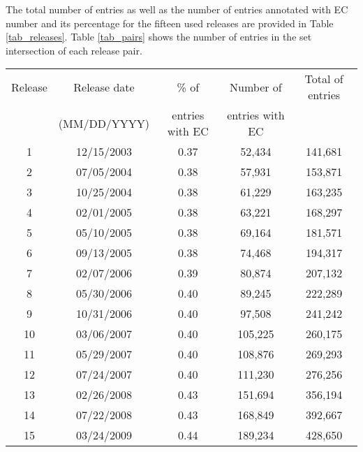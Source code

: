 The total number of entries as well as the number of entries annotated with EC number and its percentage for the fifteen used releases are provided in Table \ref{tab_releases}. Table \ref{tab_pairs} shows the number of entries in the set intersection of each release pair. 


\begin{table*}[!h]
  \caption{Releases 1 to 15 of UniProt/SwissProt.}
  \label{tab_releases}
  \scriptsize
  \begin{center}
    \begin{tabular}{ccccc}
      Release & Release date & \% of & Number of & Total of entries\\
& (MM/DD/YYYY) & entries with EC & entries with EC & \\
    \hline
	1 & 12/15/2003 & 0.37 & 52,434 & 141,681 \\
	2 & 07/05/2004 & 0.38 & 57,931 & 153,871 \\ 
	3 & 10/25/2004 & 0.38 & 61,229 & 163,235 \\ 
	4 & 02/01/2005 & 0.38 & 63,221 & 168,297 \\ 
	5 & 05/10/2005 & 0.38 & 69,164 & 181,571 \\ 
	6 & 09/13/2005 & 0.38 & 74,468 & 194,317 \\ 
	7 & 02/07/2006 & 0.39 & 80,874 & 207,132 \\ 
	8 & 05/30/2006 & 0.40 & 89,245 & 222,289 \\ 
	9 & 10/31/2006 & 0.40 & 97,508 & 241,242 \\ 
	10 & 03/06/2007 & 0.40 & 105,225 & 260,175 \\ 
	11 & 05/29/2007 & 0.40 & 108,876 & 269,293 \\ 
	12 & 07/24/2007 & 0.40 & 111,230 & 276,256 \\ 
	13 & 02/26/2008 & 0.43 & 151,694 & 356,194 \\ 
	14 & 07/22/2008 & 0.43 & 168,849 & 392,667 \\ 
	15 & 03/24/2009 & 0.44 & 189,234 & 428,650 \\ 
    \end{tabular}
  \end{center}
\end{table*}


